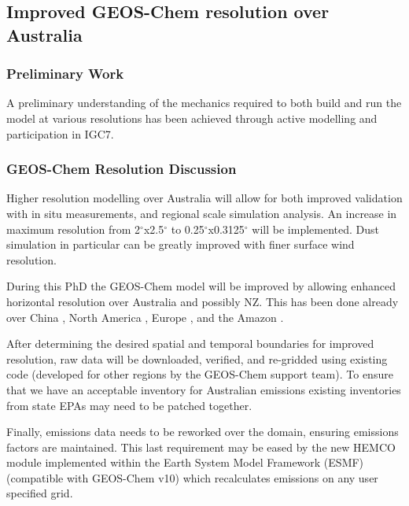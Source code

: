 \subsection{Improved GEOS-Chem resolution over Australia}
\label{resolutionwork}
\subsubsection{Preliminary Work}
A preliminary understanding of the mechanics required to both build and run the model at various resolutions has been achieved through active modelling and participation in IGC7.

\subsubsection{GEOS-Chem Resolution Discussion}
Higher resolution modelling over Australia will allow for both improved validation with in situ measurements, and regional scale simulation analysis. 
An increase in maximum resolution from 2$^{\circ}$x2.5$^{\circ}$ to 0.25$^{\circ}$x0.3125$^{\circ}$ will be implemented.
Dust simulation in particular can be greatly improved with finer surface wind resolution.

During this PhD the GEOS-Chem model will be improved by allowing enhanced horizontal resolution over Australia and possibly NZ.
This has been done already over China \cite{Chen_2009,Wang_2004}, North America \cite{Zhang_2012}, Europe \cite{Protonotariou_2013}, and the Amazon \cite{Barkley_2013}.

After determining the desired spatial and temporal boundaries for improved resolution, raw data will be downloaded, verified, and re-gridded using existing code (developed for other regions by the GEOS-Chem support team).
To ensure that we have an acceptable inventory for Australian emissions existing inventories from state EPAs may need to be patched together.

Finally, emissions data needs to be reworked over the domain, ensuring emissions factors are maintained.
This last requirement may be eased by the new HEMCO module implemented within the Earth System Model Framework (ESMF) (compatible with GEOS-Chem v10) which recalculates emissions on any user specified grid.
  